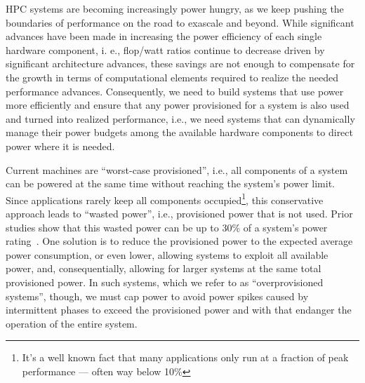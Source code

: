 
HPC systems are becoming increasingly power hungry, as we keep pushing the boundaries of
performance on the road to exascale and beyond.  While significant advances have been made
in increasing the power efficiency of each single hardware component, i. e., flop/watt
ratios continue to decrease driven by significant architecture advances, these savings are
not enough to compensate for the growth in terms of computational elements required to
realize the needed performance advances.  Consequently, we need to build systems that use
power more efficiently and ensure that any power provisioned for a system is also used and
turned into realized performance, i.e., we need systems that can  dynamically manage their
power budgets among the available hardware components to direct power where it is needed.

Current machines are ``worst-case provisioned'', i.e., all components of a system can be
powered at the same time without reaching the system's power limit. Since applications
rarely keep all components occupied\footnote{It's a well known fact that many applications
only run at a fraction of peak performance --- often way below 10\%}, this conservative
approach leads to ``wasted power'', i.e., provisioned power that is not used. Prior
studies show that this wasted power can be up to 30\% of a system's power
rating~\cite{patki:2013:eho:2464996.2465009,conductor2015}. One solution is to reduce the
provisioned power to the expected average power consumption, or even lower, allowing
systems to exploit all available power, and, consequentially, allowing for larger systems
at the same total provisioned power. In such systems, which we refer to as
``overprovisioned systems'', though, we must cap power to avoid power spikes caused by
intermittent phases to exceed the provisioned power and with that endanger the operation
of the entire system.


